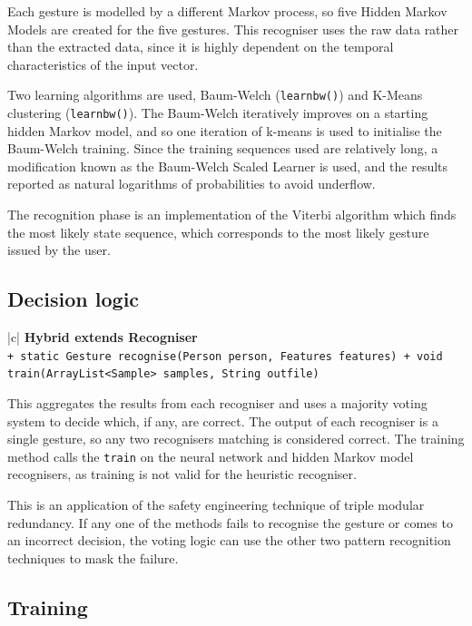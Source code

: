 \documentclass[12pt,a4,notitlepage]{report}
\renewcommand{\_}{\texttt{\symbol{95}}}
\newcommand{\<}{\texttt{\symbol{60}}}
\renewcommand{\>}{\texttt{\symbol{62}}}
\newcommand{\class}[1]{\textbf{#1}}
\newcommand{\variable}[1]{\texttt{#1}}
\begin{document}
Each gesture is modelled by a different Markov process, so five Hidden Markov Models are created for the five gestures. This recogniser uses the raw data rather than the extracted data, since it is highly dependent on the temporal characteristics of the input vector.

Two learning algorithms are used, Baum-Welch (\variable{learnbw()}) and K-Means clustering (\variable{learnbw()}). The Baum-Welch iteratively improves on a starting hidden Markov model, and so one iteration of k-means is used to initialise the Baum-Welch training. Since the training sequences used are relatively long, a modification known as the Baum-Welch Scaled Learner is used, and the results reported as natural logarithms of probabilities to avoid underflow.

The recognition phase is an implementation of the Viterbi algorithm which finds the most likely state sequence, which corresponds to the most likely gesture issued by the user.

\newpage

\subsection{Decision logic}

\begin{tabular}{|c|} \hline 
\class{Hybrid extends Recogniser} \\ \hline
{}
{ \variable{+ static Gesture recognise(Person person, Features features) \newline
+ void train(ArrayList<Sample> samples, String out\_file)
} } \\ \hline
\end{tabular}

This aggregates the results from each recogniser and uses a majority voting system to decide which, if any, are correct. The output of each recogniser is a single gesture, so any two recognisers matching is considered correct. The training method calls the \variable{train} on the neural network and hidden Markov model recognisers, as training is not valid for the heuristic recogniser.

This is an application of the safety engineering technique of triple modular redundancy. If any one of the methods fails to recognise the gesture or comes to an incorrect decision, the voting logic can use the other two pattern recognition techniques to mask the failure.

\subsection{Training}
\end{document}

